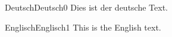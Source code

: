 \documentclass{article}
\begin{document}
\begin{ocg}{Deutsch}{Deutsch}{0}
  Dies ist der deutsche Text.
\end{ocg}

\begin{ocg}{Englisch}{Englisch}{1}
  This is the English text.
\end{ocg}

\end{document}
